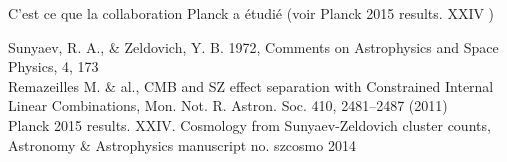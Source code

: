 \documentclass[a4paper,11pt]{article}
\begin{document}
C'est ce que la collaboration Planck a étudié (voir Planck 2015
results. XXIV \cite{Planck_SZ}) 

\newpage
\begin{thebibliography}{2}

 Sunyaev, R. A., \& Zeldovich, Y. B. 1972, Comments on
  Astrophysics and Space Physics, 4, 173 \\
  
Remazeilles M. \& al., CMB and SZ effect
  separation with Constrained Internal Linear Combinations, 
  Mon. Not. R. Astron. Soc. 410, 2481–2487 (2011)  \\

 Planck 2015 results. XXIV. Cosmology from Sunyaev-Zeldovich
cluster counts, Astronomy \& Astrophysics manuscript no. szcosmo 2014
\end{thebibliography}

\end{document}
